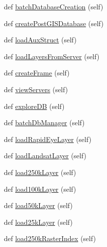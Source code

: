 \begin{DoxyCompactItemize}
\item 
def \mbox{\hyperlink{class_dsg_tools_1_1dsg__tools_1_1_dsg_tools_a8a9507bd642a3a8774e32fcf9f66f45d}{batch\+Database\+Creation}} (self)
\item 
def \mbox{\hyperlink{class_dsg_tools_1_1dsg__tools_1_1_dsg_tools_a61a45262ec8f5921d73c830dce9c41f7}{create\+Post\+G\+I\+S\+Database}} (self)
\item 
def \mbox{\hyperlink{class_dsg_tools_1_1dsg__tools_1_1_dsg_tools_a07e8c58d1e5497299d6c9e0e547ad429}{load\+Aux\+Struct}} (self)
\item 
def \mbox{\hyperlink{class_dsg_tools_1_1dsg__tools_1_1_dsg_tools_a285ff6e653cd985343cdf91acf8080ef}{load\+Layers\+From\+Server}} (self)
\item 
def \mbox{\hyperlink{class_dsg_tools_1_1dsg__tools_1_1_dsg_tools_a95aadbdfdaefe737fed7d2b7352f2d1e}{create\+Frame}} (self)
\item 
def \mbox{\hyperlink{class_dsg_tools_1_1dsg__tools_1_1_dsg_tools_a0f0a89cfc7afda1ca1ec10c6e59e3541}{view\+Servers}} (self)
\item 
def \mbox{\hyperlink{class_dsg_tools_1_1dsg__tools_1_1_dsg_tools_a672657bbc8d5b00fb485dea4eef6fcb1}{explore\+DB}} (self)
\item 
def \mbox{\hyperlink{class_dsg_tools_1_1dsg__tools_1_1_dsg_tools_a40c7799a46e2b15d7a6918d91574d6b9}{batch\+Db\+Manager}} (self)
\item 
def \mbox{\hyperlink{class_dsg_tools_1_1dsg__tools_1_1_dsg_tools_affa471f53e1d341e8996ac5c7e9e3544}{load\+Rapid\+Eye\+Layer}} (self)
\item 
def \mbox{\hyperlink{class_dsg_tools_1_1dsg__tools_1_1_dsg_tools_a9210b9ea240c9d2bdf58d4e667090cf7}{load\+Landsat\+Layer}} (self)
\item 
def \mbox{\hyperlink{class_dsg_tools_1_1dsg__tools_1_1_dsg_tools_ae2142392ed294e7274cbdbe1421c316c}{load250k\+Layer}} (self)
\item 
def \mbox{\hyperlink{class_dsg_tools_1_1dsg__tools_1_1_dsg_tools_a9d7bc8c97b5ed7c1758e25a4cf6695ec}{load100k\+Layer}} (self)
\item 
def \mbox{\hyperlink{class_dsg_tools_1_1dsg__tools_1_1_dsg_tools_a5e6e11f1f5a55805a7e6e79a6276f6d8}{load50k\+Layer}} (self)
\item 
def \mbox{\hyperlink{class_dsg_tools_1_1dsg__tools_1_1_dsg_tools_adcbf7249e2335d38e00b491002cf0457}{load25k\+Layer}} (self)
\item 
def \mbox{\hyperlink{class_dsg_tools_1_1dsg__tools_1_1_dsg_tools_a1246a93b168ad0d4feb6a6dd4cbdb367}{load250k\+Raster\+Index}} (self)

\end{DoxyCompactItemize}
